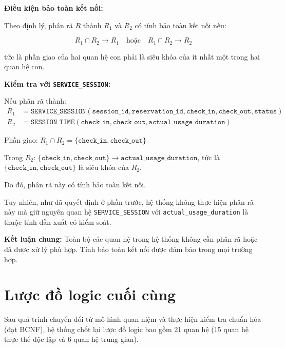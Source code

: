 \textbf{Điều kiện bảo toàn kết nối:}

Theo định lý, phân rã $R$ thành $R_1$ và $R_2$ có tính bảo toàn kết nối nếu:

$$R_1 \cap R_2 \rightarrow R_1 \quad \text{hoặc} \quad R_1 \cap R_2 \rightarrow R_2$$

tức là phần giao của hai quan hệ con phải là siêu khóa của ít nhất một trong hai quan hệ con.

\textbf{Kiểm tra với \texttt{SERVICE\_SESSION}:}

Nếu phân rã thành:
\begin{align*}
R_1 &= \texttt{SERVICE\_SESSION}(\texttt{session\_id}, \texttt{reservation\_id}, \texttt{check\_in}, \texttt{check\_out}, \texttt{status}) \\
R_2 &= \texttt{SESSION\_TIME}(\texttt{check\_in}, \texttt{check\_out}, \texttt{actual\_usage\_duration})
\end{align*}

Phần giao: $R_1 \cap R_2 = \{\texttt{check\_in}, \texttt{check\_out}\}$

Trong $R_2$: $\{\texttt{check\_in}, \texttt{check\_out}\} \rightarrow \texttt{actual\_usage\_duration}$, tức là $\{\texttt{check\_in}, \texttt{check\_out}\}$ là siêu khóa của $R_2$.

Do đó, phân rã này có tính bảo toàn kết nối.

Tuy nhiên, như đã quyết định ở phần trước, hệ thống không thực hiện phân rã này mà giữ nguyên quan hệ \texttt{SERVICE\_SESSION} với \texttt{actual\_usage\_duration} là thuộc tính dẫn xuất có kiểm soát.

\textbf{Kết luận chung:} Toàn bộ các quan hệ trong hệ thống không cần phân rã hoặc đã được xử lý phù hợp. Tính bảo toàn kết nối được đảm bảo trong mọi trường hợp.

\section{Lược đồ logic cuối cùng}
Sau quá trình chuyển đổi từ mô hình quan niệm và thực hiện kiểm tra chuẩn hóa (đạt BCNF), hệ thống chốt lại lược đồ logic bao gồm 21 quan hệ (15 quan hệ thực thể độc lập và 6 quan hệ trung gian).

